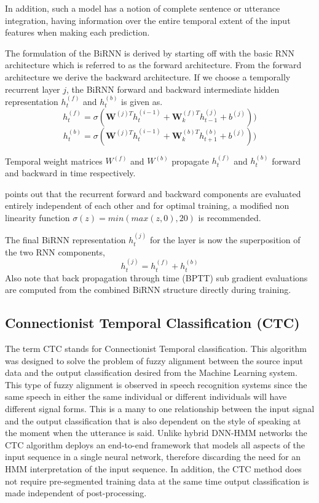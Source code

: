 In addition, such a model has a notion of complete sentence or utterance  integration, having information over the entire temporal extent of the input features when making each prediction. 

The formulation of the BiRNN is derived by starting off with the basic RNN architecture which is referred to as the forward architecture.  From the forward architecture we derive the backward architecture. If we choose a temporally recurrent layer $j$, the BiRNN forward and backward intermediate hidden representation $h^{(f)}_t$ and $h^{(b)}_t$ is given as. 
\begin{equation}h_t^{(f)}=\sigma(\mathbf{W}^{(j)T}h_t^{(i-1)}+\mathbf{W}^{(f)T}_kh_{t-1}^{(j)}+b^{(j)}))
\label{eqn_c3_ds01}\end{equation}
\begin{equation}h_t^{(b)}=\sigma(\mathbf{W}^{(j)T}h_t^{(i-1)}+\mathbf{W}^{(b)T}_kh_{t+1}^{(b)}+b^{(j)}))
\label{eqn_c3_ds02}\end{equation}

Temporal weight matrices $W^{(f)}$ and $W^{(b)}$ propagate $h^{(f)}_t$  and $h^{(b)}_t$ forward and backward in time respectively. 

\cite{hannun2014first} points out that the recurrent forward and backward components are evaluated entirely independent of each other and for optimal training, a modified non linearity function $\sigma(z) = min(max(z, 0), 20)$ is recommended. 

The final BiRNN representation $h^{(j)}_t$ for the layer is now the superposition of the two RNN components,
 \begin{equation}h_t^{(j)}=h_t^{(f)}+h_t^{(b)}
\label{eqn_c3_ds03}\end{equation}
Also note that back propagation through time (BPTT) sub gradient evaluations are computed from the combined BiRNN structure directly during training.

\subsection{Connectionist Temporal Classification (CTC)}\label{c3_ctc}
The term CTC stands for Connectionist Temporal classification.  This algorithm was designed to solve the problem of fuzzy alignment between the source input data and the output classification desired from the Machine Learning system.  This type of fuzzy alignment is observed in speech recognition systems since the same speech in either the same individual or different individuals will have different signal forms.  This is a many to one relationship between the input signal and the output classification that is also dependent on the style of speaking at the moment when the utterance is said.  Unlike hybrid DNN-HMM networks the CTC algorithm deploys an end-to-end framework that models all aspects of the input sequence in a single neural network, therefore discarding the need for an HMM interpretation of the input sequence. In  addition, the CTC method does not require pre-segmented training data at the same time output classification is made independent of post-processing.

